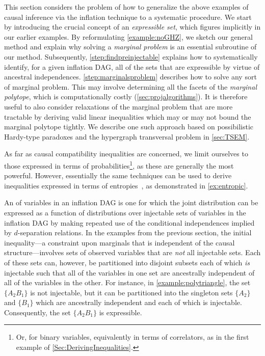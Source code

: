 \documentclass[aps,english,10pt,superscriptaddress,onecolumn,twoside,longbibliography,pra,floatfix,fleqn,nofootinbib]{revtex4-1}%
\newcommand*{\tblue}[1]{{\color{MidnightBlue}{\textbf{#1}}}}
\theoremstyle{definition}
\newcounter{example}[section]
\begin{document}
This section considers the problem of how to generalize the above examples of causal inference via the inflation technique to a systematic procedure. We start by introducing the crucial concept of an \emph{expressible set},
 which figures implicitly in our earlier examples. By reformulating \cref{example:noGHZ}, we sketch our general method and explain why solving a \emph{marginal problem} is an essential subroutine of our method. Subsequently, \cref{step:findpreinjectable} explains how to systematically identify, for a given inflation DAG, all of the 
 sets that are expressible by virtue of ancestral independences.
 \cref{step:marginalsproblem} describes how to solve any sort of marginal problem. This may involve determining all the facets of the \emph{marginal polytope}, which is computationally costly (\cref{sec:projalgorithms}).  It is therefore useful to also consider relaxations of the marginal problem that are more tractable by deriving valid linear inequalities which may or may not bound the marginal polytope tightly. We describe one such approach based on possibilistic Hardy-type paradoxes and the hypergraph transversal problem in \cref{sec:TSEM}.

As far as causal compatibility inequalities are concerned, we limit ourselves to those expressed in terms of probabilities\footnote{Or, for binary variables, equivalently in terms of correlators, as in the first example of \cref{Sec:DerivingInequalities}.}, as these are generally the most powerful. However, essentially the same techniques can be used to derive inequalities expressed in terms of entropies~\cite{fritz2013marginal}, as demonstrated in \cref{ex:entropic}. 

 An \tblue{expressible set} of variables in an inflation DAG is one for which the joint distribution can be expressed as a function of distributions over injectable sets of variables in the inflation DAG by making repeated use of the conditional independences implied by $d$-separation relations.
In the examples from the previous section, the initial inequality---a constraint upon marginals that is independent of the causal structure---involves sets of observed variables that are \emph{not} all injectable sets.  Each of these sets can, however, be partitioned into disjoint subsets each of which {\em is} injectable such that all of the variables in one set are ancestrally independent of all of the variables in the other.
   For instance, in \cref{example:polytriangle}, the set $\{ A_2 B_1\}$ is not injectable, but it can be partitioned into the singleton sets $\{ A_2 \}$ and $\{ B_1\}$ which are ancestrally independent and each of which is injectable. Consequently, the set $\{ A_2 B_1\}$ is expressible.   
\end{document}
